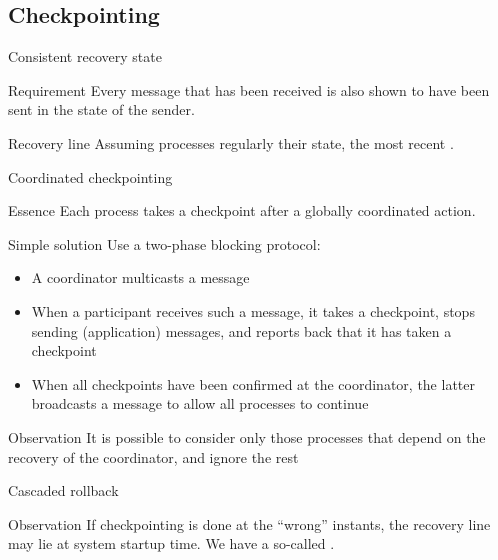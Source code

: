 \subsection{Checkpointing}
\begin{slide}{Consistent recovery state}
  \begin{alertblock}{Requirement} 
    Every message that has been received is also shown to have been sent in the state of the sender.
  \end{alertblock}
  \begin{block}{Recovery line} 
    Assuming processes regularly  their state, the most recent .
  \end{block}
  \begin{centerfig}
  \end{centerfig}
\end{slide}
\begin{slide}{Coordinated checkpointing}
  \begin{block}{Essence} 
    Each process takes a checkpoint after a globally coordinated action.
  \end{block}
  \begin{block}{Simple solution}
    Use a two-phase blocking protocol:
    \begin{itemize}\tightlist
    \item A coordinator multicasts a  message
    \item When a participant receives such a message, it takes a checkpoint, stops sending (application)
      messages, and reports back that it has taken a checkpoint
    \item When all checkpoints have been confirmed at the coordinator, the latter broadcasts a
       message to allow all processes to continue
    \end{itemize}
  \end{block}
  \onslide
  \begin{block}{Observation} 
    It is possible to consider only those processes that depend on the recovery of the coordinator, and ignore
    the rest
  \end{block}
\end{slide}
\begin{slide}{Cascaded rollback}
  \begin{block}{Observation} 
    If checkpointing is done at the ``wrong'' instants, the recovery line may lie at system startup time. We
    have a so-called .
  \end{block}
  \begin{centerfig}
  \end{centerfig}
\end{slide}
